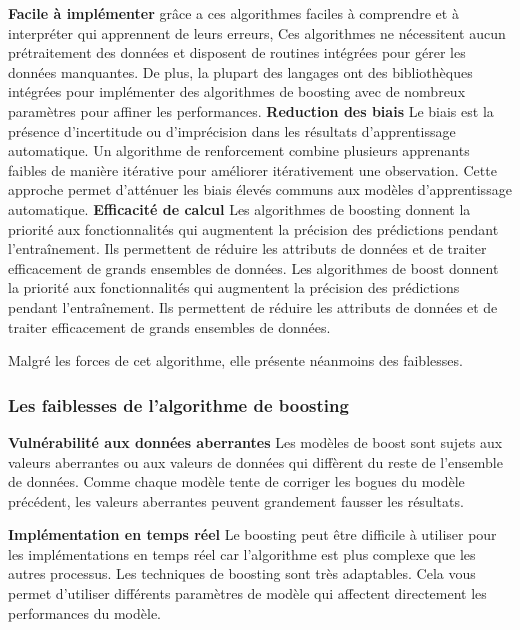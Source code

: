 \documentclass[french,a4paper,12pt]{article}
\begin{document}
\textbf{ Facile à implémenter }
\quad  grâce a ces algorithmes faciles à comprendre et à interpréter qui apprennent de leurs erreurs, Ces algorithmes ne nécessitent aucun prétraitement des données et disposent de routines intégrées pour gérer les données manquantes. De plus, la plupart des langages ont des bibliothèques intégrées pour implémenter des algorithmes de boosting avec de nombreux paramètres pour affiner les performances.
\textbf{Reduction des biais }
\quad Le biais est la présence d'incertitude ou d'imprécision dans les résultats d'apprentissage automatique. Un algorithme de renforcement combine plusieurs apprenants faibles de manière itérative pour améliorer itérativement une observation. Cette approche permet d'atténuer les biais élevés communs aux modèles d'apprentissage automatique.
\textbf{Efficacité de calcul }
\quad Les algorithmes de boosting donnent la priorité aux fonctionnalités qui augmentent la précision des prédictions pendant l'entraînement. Ils permettent de réduire les attributs de données et de traiter efficacement de grands ensembles de données. Les algorithmes de boost donnent la priorité aux fonctionnalités qui augmentent la précision des prédictions pendant l'entraînement. Ils permettent de réduire les attributs de données et de traiter efficacement de grands ensembles de données.

\quad Malgré les forces de cet algorithme, elle présente néanmoins des faiblesses. 
\subsubsection{Les faiblesses de l'algorithme de boosting}

\textbf{Vulnérabilité aux données aberrantes }
\quad Les modèles de boost sont sujets aux valeurs aberrantes ou aux valeurs de données qui diffèrent du reste de l'ensemble de données. Comme chaque modèle tente de corriger les bogues du modèle précédent, les valeurs aberrantes peuvent grandement fausser les résultats.

\textbf{Implémentation en temps réel}
\quad Le boosting peut être difficile à utiliser pour les implémentations en temps réel car l'algorithme est plus complexe que les autres processus. Les techniques de boosting sont très adaptables. Cela vous permet d'utiliser différents paramètres de modèle qui affectent directement les performances du modèle.
\end{document}
